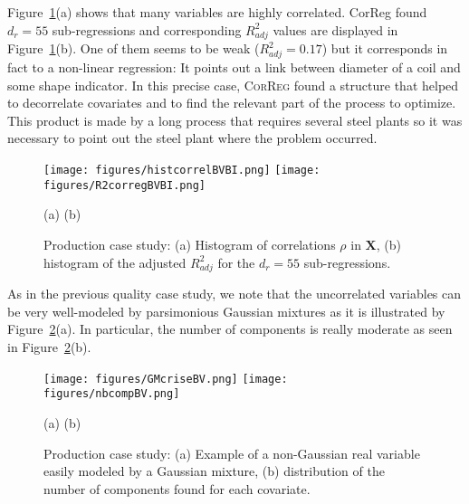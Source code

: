 \documentclass[12pt,a4paper]{report}
\begin{document}
		
		
Figure~\ref{fig:graphCorr.production}(a) shows that many variables are highly correlated. {\sc CorReg} found $d_r=55$ sub-regressions and corresponding $R_{adj}^2$ values are displayed in Figure~\ref{fig:graphCorr.production}(b). One of them seems to be weak ($R_{adj}^2=0.17$) but it corresponds in fact to a non-linear regression: It points out a link between diameter of a coil and some shape indicator. In this precise case, \textsc{CorReg} found a structure that helped to decorrelate covariates and to find the relevant part of the process to optimize. This product is made by a long process that requires several steel plants so it was necessary to point out the steel plant where the problem occurred.	
		

\begin{figure}[h!]
\begin{center}
			\texttt{[image: figures/histcorrelBVBI.png]}
			\texttt{[image: figures/R2corregBVBI.png]}
\end{center}
\vspace{-5mm}
			\centerline{(a) \hspace{180px} (b)}
			\caption{Production case study: (a) Histogram of correlations $\rho$ in $\boldsymbol{X}$, (b) histogram of the adjusted $R^2_{adj}$ for the $d_r=55$ sub-regressions.}\label{fig:graphCorr.production}
\end{figure}  	

\vspace{3mm}

As in the previous quality case study, we note that the uncorrelated variables can be very well-modeled by parsimonious Gaussian mixtures as it is illustrated by Figure~\ref{fig:graphMixmod.production}(a). In particular, the number of components is really moderate as seen in Figure~\ref{fig:graphMixmod.production}(b).

\vspace{3mm}

		\begin{figure}[h!]
\begin{center}
			\texttt{[image: figures/GMcriseBV.png]}
			\texttt{[image: figures/nbcompBV.png]}
\end{center}
\vspace{-5mm}
			\centerline{(a) \hspace{180px} (b)}
			\caption{Production case study: (a) Example of a non-Gaussian real variable easily modeled by a Gaussian mixture, (b) distribution of the number of components found for each covariate.}\label{fig:graphMixmod.production}
\end{figure}  	
\end{document}
